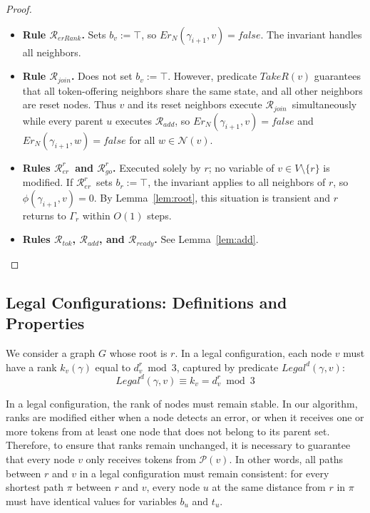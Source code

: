 \documentclass[a4paper, 12pt]{article}
\newcommand{\Pa}{\mathcal{P}}
\newcommand{\rk}{k}
\newcommand{\RerRank}{$\mathscr{R}_{erRank}$}
\newcommand{\Rjoin}{$\mathscr{R}_{join}$}
\newcommand{\Rtok}{$\mathscr{R}_{tok}$}
\newcommand{\Radd}{$\mathscr{R}_{add}$}
\newcommand{\Rready}{$\mathscr{R}_{ready}$}
\newcommand{\RerRoot}{$\mathscr{R}^r_{er}$}
\newcommand{\Rgo}{$\mathscr{R}^r_{go}$}
\begin{document}
\begin{proof}
\begin{itemize}
\item \textbf{Rule \RerRank.} Sets $b_v := \top$, so
$Er_N(\gamma_{i+1}, v) = \mathit{false}$.
The invariant handles all neighbors.

\item \textbf{Rule \Rjoin.} Does not set $b_v := \top$.
However, predicate $\mathit{TakeR}(v)$ guarantees that all
token-offering neighbors share the same state, and all other
neighbors are reset nodes. Thus $v$ and its reset neighbors
execute \Rjoin\ simultaneously while every parent $u$ executes
\Radd, so $Er_N(\gamma_{i+1}, v) = \mathit{false}$ and
$Er_N(\gamma_{i+1}, w) = \mathit{false}$ for all
$w \in \mathcal{N}(v)$.

\item \textbf{Rules \RerRoot\ and \Rgo.} Executed solely by $r$;
no variable of $v \in V \setminus \{r\}$ is modified.
If \RerRoot\ sets $b_r := \top$, the invariant applies to
all neighbors of $r$, so $\phi(\gamma_{i+1}, v) = 0$.
By Lemma~\ref{lem:root}, this situation is transient and
$r$ returns to $\Gamma_r$ within $O(1)$ steps.

\item \textbf{Rules \Rtok, \Radd, and \Rready.}
See Lemma~\ref{lem:add}.

\end{itemize}
\end{proof}
\subsection{Legal Configurations: Definitions and Properties}
\label{sec:legal}

We consider a graph $G$ whose root is $r$. In a legal configuration, 
each node $v$ must have a rank $\rk_v(\gamma)$ equal to $d^r_v \bmod 3$, 
captured by predicate $Legal^d(\gamma,v)$:
\begin{equation}
    Legal^d(\gamma,v) \equiv \rk_v = d^r_v \bmod 3
    \label{eq:legald}
\end{equation}

In a legal configuration, the rank of nodes must remain stable. In our 
algorithm, ranks are modified either when a node detects an error, or 
when it receives one or more tokens from at least one node that does not 
belong to its parent set. Therefore, to ensure that ranks remain 
unchanged, it is necessary to guarantee that every node $v$ only receives 
tokens from $\Pa(v)$. In other words, all paths between $r$ and $v$ in a 
legal configuration must remain consistent: for every shortest path $\pi$ 
between $r$ and $v$, every node $u$ at the same distance from $r$ in 
$\pi$ must have identical values for variables $b_u$ and $t_u$.
\end{document}
